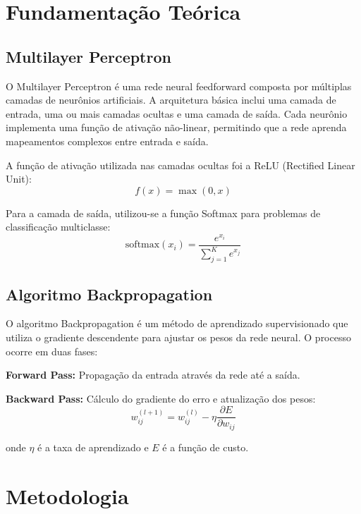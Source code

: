 \documentclass[12pt]{article}
\begin{document}
\section{Fundamentação Teórica}

\subsection{Multilayer Perceptron}

O Multilayer Perceptron é uma rede neural feedforward composta por múltiplas camadas de neurônios artificiais. A arquitetura básica inclui uma camada de entrada, uma ou mais camadas ocultas e uma camada de saída. Cada neurônio implementa uma função de ativação não-linear, permitindo que a rede aprenda mapeamentos complexos entre entrada e saída.

A função de ativação utilizada nas camadas ocultas foi a ReLU (Rectified Linear Unit):
\begin{equation}
f(x) = \max(0, x)
\end{equation}

Para a camada de saída, utilizou-se a função Softmax para problemas de classificação multiclasse:
\begin{equation}
\text{softmax}(x_i) = \frac{e^{x_i}}{\sum_{j=1}^{K} e^{x_j}}
\end{equation}

\subsection{Algoritmo Backpropagation}

O algoritmo Backpropagation é um método de aprendizado supervisionado que utiliza o gradiente descendente para ajustar os pesos da rede neural. O processo ocorre em duas fases:

\textbf{Forward Pass:} Propagação da entrada através da rede até a saída.

\textbf{Backward Pass:} Cálculo do gradiente do erro e atualização dos pesos:
\begin{equation}
w_{ij}^{(l+1)} = w_{ij}^{(l)} - \eta \frac{\partial E}{\partial w_{ij}}
\end{equation}

onde $\eta$ é a taxa de aprendizado e $E$ é a função de custo.

\section{Metodologia}
\end{document}
